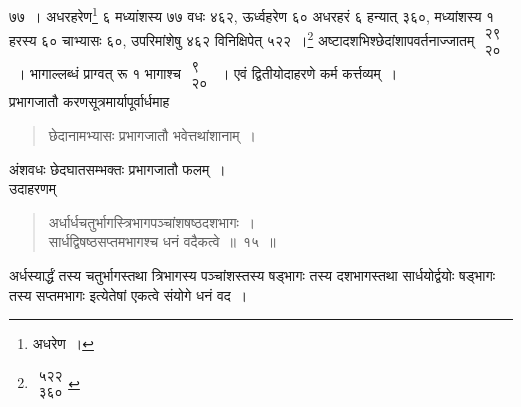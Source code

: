 \documentclass[10pt, openany]{book}
\begin{document}

\newpage


{७७~। अधरहरेण\renewcommand{\thefootnote}{\s १}\footnote{\s अधरेण~।} ६ मध्यांशस्य ७७ वधः ४६२, ऊर्ध्वहरेण ६० अधरहरं ६
हन्यात् ३६०,}
{मध्यांशस्य १ हरस्य ६० चाभ्यासः ६०, उपरिमांशेषु ४६२ विनिक्षिपेत् ५२२~।\renewcommand{\thefootnote}{\s २}\footnote{\s $\begin{matrix}

\mbox{{५२२}}\\

\mbox{{३६०}}

\end{matrix}$} अष्टादशभिश्छेदांशापवर्तनाज्जातम् $\begin{matrix}

\mbox{{२९}}\\

\mbox{{२०}}

\end{matrix}$~। भागाल्लब्धं प्राग्वत् रू १ भागाश्च $\begin{matrix}

\mbox{{९}}\\

\mbox{{२०}}

\end{matrix}$~। एवं द्वितीयोदाहरणे कर्म कर्त्तव्यम्~।}\\

{प्रभागजातौ करणसूत्रमार्यापूर्वार्धमाह\textemdash}

\begin{quote}
    
{\bs छेदानामभ्यासः प्रभागजातौ भवेत्तथांशानाम्~।}\end{quote}

{अंशवधः छेदघातसम्भक्तः प्रभागजातौ फलम्~।}\\

{उदाहरणम्\textemdash}

\begin{quote}
    
{\eg  अर्धार्धचतुर्भागस्त्रिभागपञ्चांशषष्ठदशभागः~। \\
 सार्धद्विषष्ठसप्तमभागश्च धनं वदैकत्वे~॥~१५~॥}\end{quote}

{अर्धस्यार्द्धं तस्य चतुर्भागस्तथा त्रिभागस्य पञ्चांशस्तस्य षड्भागः
तस्य दशभागस्तथा}
{सार्धयोर्द्वयोः षड्भागः तस्य सप्तमभागः इत्येतेषां एकत्वे संयोगे धनं वद~।}\\
\end{document}
